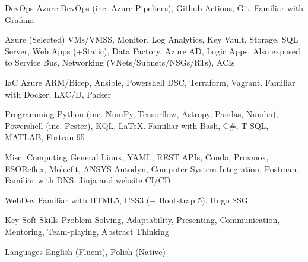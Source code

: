 

\begin{cvskills}

  \cvskill
    {DevOps} 
    {Azure DevOps (inc. Azure Pipelines), Github Actions, Git. Familiar with Grafana} 

  \cvskill
    {Azure (Selected)} 
    {VMs/VMSS, Monitor, Log Analytics, Key Vault, Storage, SQL Server, Web Apps (+Static), Data Factory, Azure AD, Logic Apps. Also exposed to Service Bus, Networking (VNets/Subnets/NSGs/RTs), ACIs}

  \cvskill
    {IaC} 
    {Azure ARM/Bicep, Ansible, Powershell DSC, Terraform, Vagrant. Familiar with Docker, LXC/D, Packer} 

  \cvskill
    {Programming} 
    {Python (inc. NumPy, Tensorflow, Astropy, Pandas, Numba), Powershell (inc. Pester), KQL, \LaTeX. Familiar with Bash, C\#, T-SQL, MATLAB, Fortran 95} 
    
  \cvskill
    {Misc. Computing} 
    {General Linux, YAML, REST APIs, Conda, Proxmox, ESOReflex, Molecfit, ANSYS Autodyn, Computer System Integration, Postman. Familiar with DNS, Jinja and website CI/CD} 

  \cvskill
    {WebDev} 
    {Familiar with HTML5, CSS3 (+ Bootstrap 5), Hugo SSG} 

  \cvskill
    {Key Soft Skills} 
    {Problem Solving, Adaptability, Presenting, Communication, Mentoring, Team-playing, Abstract Thinking} 

  \cvskill
    {Languages} 
    {English (Fluent), Polish (Native)} 
    
\end{cvskills}
